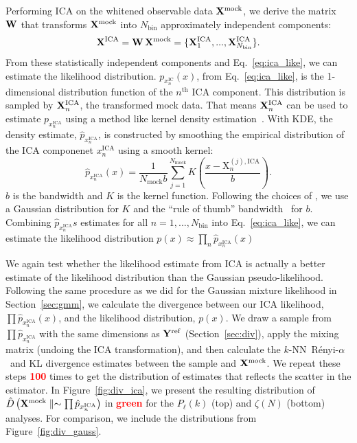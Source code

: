 \documentclass[12pt, letterpaper, preprint]{aastex}
\newcommand{\beq}{\begin{equation}}
\newcommand{\eeq}{\end{equation}}
\newcommand{\todo}[1]{{\bf \textcolor{red}{#1}}}
\newcommand{\Xmock}{{\bf X}^\mathrm{mock}}
\newcommand{\Yref}{{\bf Y}^\mathrm{ref}}
\newcommand{\Ralpha}{R\'enyi-$\alpha$}
\begin{document}
Performing ICA on the whitened observable data $\Xmock$, we derive the 
matrix ${\bf W}$ that transforms $\Xmock$ into $N_\mathrm{bin}$
approximately independent components: 
\beq
{\bf X}^\mathrm{ICA} = {\bf W}\,\Xmock = \{{\bf X}^\mathrm{ICA}_1, ..., {\bf X}^\mathrm{ICA}_{N_\mathrm{bin}}\}.
\eeq
From these statistically independent components and Eq.~\ref{eq:ica_like}, 
we can estimate the likelihood distribution. $p_{x^\mathrm{IC}_n} (x)$, 
from Eq.~\ref{eq:ica_like}, is the 1-dimensional distribution 
function of the $n^\mathrm{th}$ ICA component. This distribution 
is sampled by ${\bf X}^\mathrm{ICA}_n$, the transformed mock data. 
That means ${\bf X}^\mathrm{ICA}_n$ can be used to estimate 
$p_{x^\mathrm{ICA}_n}$ using a method like kernel 
density estimation~\citep[KDE; \emph{e.g.}][]{9780387848587,feigelson2012}. 
With KDE, the density estimate, $\hat{p}_{x^\mathrm{ICA}_n}$, is constructed by 
smoothing the empirical distribution of the ICA componenet $x^\mathrm{ICA}_n$ 
using a smooth kernel: 
\beq
\hat{p}_{x^\mathrm{ICA}_n}(x) = \frac{1}{N_\mathrm{mock}b} \sum\limits_{j=1}^{N_\mathrm{mock}} K \left( \frac{x - \mathrm{X}^{(j),\mathrm{ICA}}_n}{b} \right). 
\eeq
$b$ is the bandwidth and $K$ is the kernel function. Following the 
choices of \cite{hartlap2009}, we use a Gaussian distribution for $K$ and the 
``rule of thumb'' bandwidth~\cite[also known as Scott's rule;][]{scott1992,davison2008} 
for $b$. Combining $\hat{p}_{x^\mathrm{ICA}_n}s$ estimates for 
all $n = 1, ..., N_\mathrm{bin}$ into Eq.~\ref{eq:ica_like}, we 
can estimate the likelihood distribution $p(x) \approx \prod\limits_n \hat{p}_{x^\mathrm{ICA}_n}(x)$

We again test whether the likelihood estimate from ICA is actually 
a better estimate of the likelihood distribution than the Gaussian 
pseudo-likelihood. Following the same procedure as we 
did for the Gaussian mixture likelihood in Section~\ref{sec:gmm}, we 
calculate the divergence between our ICA likelihood, $\prod \hat{p}_{x^\mathrm{ICA}_n}(x)$, 
and the likelihood distribution, $p(x)$. We draw a sample from 
$\prod \hat{p}_{x^\mathrm{ICA}_n}$ with the same dimensions as 
$\Yref$ (Section~\ref{sec:div}), apply the mixing matrix 
(undoing the ICA transformation), and then calculate the 
$k$-NN~\Ralpha~and KL divergence estimates between the sample and $\Xmock$. 
We repeat these steps \todo{100} times to get the distribution of estimates 
that reflects the scatter in the estimator. In Figure~\ref{fig:div_ica}, 
we present the resulting distribution of 
$\hat{D}\left(\Xmock \parallel \sim \prod \hat{p}_{x^\mathrm{ICA}_n} \right)$
in \todo{green} for the $P_\ell(k)$ (top) and $\zeta(N)$ (bottom) analyses. 
For comparison, we include the distributions from Figure~\ref{fig:div_gauss}. 
\end{document}
